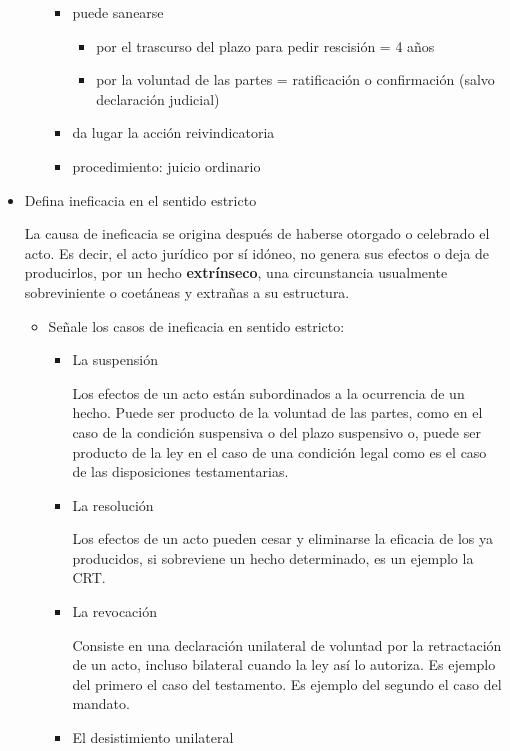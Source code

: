 \documentclass[]{article}
\providecommand{\tightlist}{%
  \setlength{\itemsep}{0pt}\setlength{\parskip}{0pt}}
\begin{document}
\begin{itemize}
\begin{itemize}
    \begin{itemize}
    \tightlist
    \item
      puede sanearse

      \begin{itemize}
      \tightlist
      \item
        por el trascurso del plazo para pedir rescisión = 4 años
      \item
        por la voluntad de las partes = ratificación o confirmación
        (salvo declaración judicial)
      \end{itemize}
    \item
      da lugar la acción reivindicatoria
    \item
      procedimiento: juicio ordinario
    \end{itemize}
  \end{itemize}
\item
  Defina ineficacia en el sentido estricto

  La causa de ineficacia se origina después de haberse otorgado o
  celebrado el acto. Es decir, el acto jurídico por sí idóneo, no genera
  sus efectos o deja de producirlos, por un hecho \textbf{extrínseco},
  una circunstancia usualmente sobreviniente o coetáneas y extrañas a su
  estructura.

  \begin{itemize}
  \tightlist
  \item
    Señale los casos de ineficacia en sentido estricto:

    \begin{itemize}
    \item
      La suspensión

      Los efectos de un acto están subordinados a la ocurrencia de un
      hecho. Puede ser producto de la voluntad de las partes, como en el
      caso de la condición suspensiva o del plazo suspensivo o, puede
      ser producto de la ley en el caso de una condición legal como es
      el caso de las disposiciones testamentarias.
    \item
      La resolución

      Los efectos de un acto pueden cesar y eliminarse la eficacia de
      los ya producidos, si sobreviene un hecho determinado, es un
      ejemplo la CRT.
    \item
      La revocación

      Consiste en una declaración unilateral de voluntad por la
      retractación de un acto, incluso bilateral cuando la ley así lo
      autoriza. Es ejemplo del primero el caso del testamento. Es
      ejemplo del segundo el caso del mandato.
    \item
      El desistimiento unilateral


\end{itemize}
\end{itemize}
\end{itemize}
\end{document}

